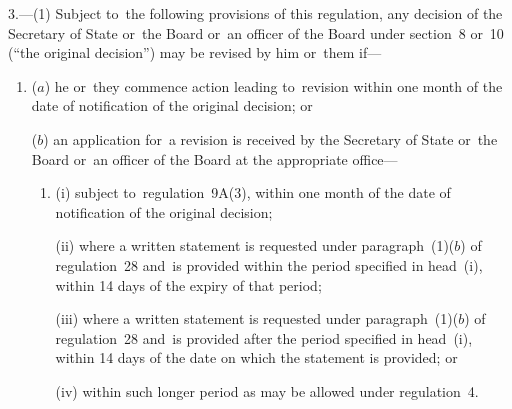 \documentclass[12pt,a4paper]{article}
\begin{document}
3.—(1) Subject to~the following provisions of this regulation, any decision of the Secretary of State 
or~the Board or~an officer of the Board  %
under section~8 or~10 (“the original decision”) may be revised by him 
or~them  %
if—
\begin{enumerate}\item[]

%
%
%
%

($a$) he or~they commence action leading to~revision within one month of the date of notification of the original decision; or

($b$) an application for~a revision is received by the Secretary of State or~the Board or~an officer of the Board at the appropriate office—
\begin{enumerate}\item[]
(i) subject to~regulation~9A(3), within one month of the date of notification of the original decision;

(ii) where a written statement is requested under paragraph~(1)($b$)  of regulation~28 and~is provided within the period specified in head~(i), within 14 days of the expiry of that period;

(iii) where a written statement is requested under paragraph~(1)($b$)  of regulation~28 and~is provided after the period specified in head~(i), within 14 days of the date on which the statement is provided; or

(iv) within such longer period as may be allowed under regulation~4.
\end{enumerate}
\end{enumerate}
\end{document}
